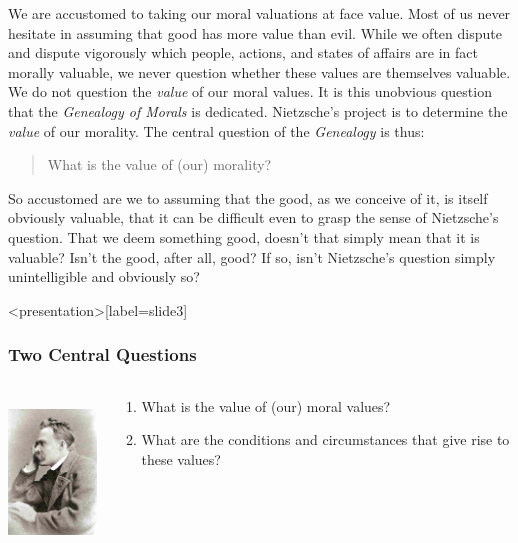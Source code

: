 We are accustomed to taking our moral valuations at face value. Most of us never hesitate in assuming that good has more value than evil. While we often dispute and dispute vigorously which people, actions, and states of affairs are in fact morally valuable, we never question whether these values are themselves valuable. We do not question the \emph{value} of our moral values. It is this unobvious question that the \emph{Genealogy of Morals} is dedicated. Nietzsche's project is to determine the \emph{value} of our morality. The central question of the \emph{Genealogy} is thus:
\begin{quote}
    What is the value of (our) morality?
\end{quote}
So accustomed are we to assuming that the good, as we conceive of it, is itself obviously valuable, that it can be difficult even to grasp the sense of Nietzsche's question. That we deem something good, doesn't that simply mean that it is valuable? Isn't the good, after all, good? If so, isn't Nietzsche's question simply unintelligible and obviously so? \change

\begin{frame}<presentation>[label=slide3]
    \frametitle{Two Central Questions}
        \begin{columns}
            \begin{column}{3cm}
                \includegraphics[height=4cm]{../../../graphics/nietzsche.jpg}
            \end{column}
            \begin{column}{7cm}
                \begin{enumerate}
                    \item What is the value of (our) moral values?
                    \item What are the conditions and circumstances that give rise to these values?
                \end{enumerate}
            \end{column}
        \end{columns}
\end{frame}


